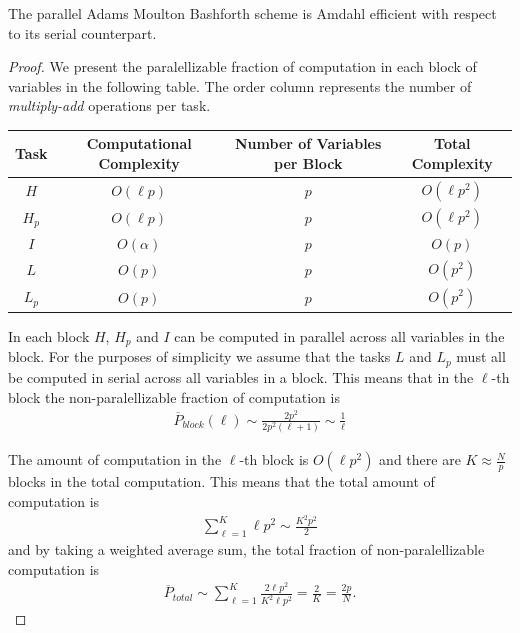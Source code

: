 \begin{mdframed}[innertopmargin=10pt]
\begin{proposition}
The parallel Adams Moulton Bashforth scheme is Amdahl efficient with respect to its serial counterpart.
\end{proposition}
\end{mdframed}
\begin{proof}
We present the paralellizable fraction of computation in each block of variables in the following table. The order column represents the number of \emph{multiply-add} operations per task.

\begin{tabular}[ht]{|c|c|c|c|}
\hline
Task        & Computational Complexity  & Number of Variables per Block     & Total Complexity \\ \hline
$ H $       & $ O(\ell p ) $            & $ p $                             & $ O(\ell p^2) $ \\ \hline
$ H_p $     & $ O(\ell p ) $            & $ p $                             & $ O(\ell p^2) $ \\ \hline
$ I $       & $ O( \alpha ) $           & $ p $                             & $ O(p) $ \\ \hline \hline          
$ L $       & $ O( p ) $                & $ p $                             & $ O(p^2) $ \\ \hline
$ L_p $     & $ O( p ) $                & $ p $                             & $ O(p^2) $ \\ \hline
\end{tabular}

In each block $ H $, $ H_p $ and $ I $ can be computed in parallel across all variables in the block. For the purposes of simplicity we assume that the tasks $ L $ and $ L_p $ must all be computed in serial across all variables in a block. This means that in the $ \ell$-th block the non-paralellizable fraction of computation is
\begin{align}
    \overline{P}_{block}(\ell) \sim \frac{2p^2}{2p^2(\ell + 1) } \sim \frac{1}{\ell}
\end{align}

The amount of computation in the $ \ell$-th block is $ O(\ell p^2) $ and there are $ K \approx \frac{N}{p} $ blocks in the total computation. This means that the total amount of computation is
\begin{align}
    \sum_{\ell=1}^{K} \ell p^2 \sim \frac{K^2p^2}{2}
\end{align}
and by taking a weighted average sum, the total fraction of non-paralellizable computation is
\begin{align}
    \label{eq:tot_par_c}
    \overline{P}_{total} \sim \sum_{\ell = 1}^{K} \frac{2\ell p^2}{K^2 \ell p^2} = \frac{2}{K} = \frac{2p}{N}.
\end{align}


\end{proof}

